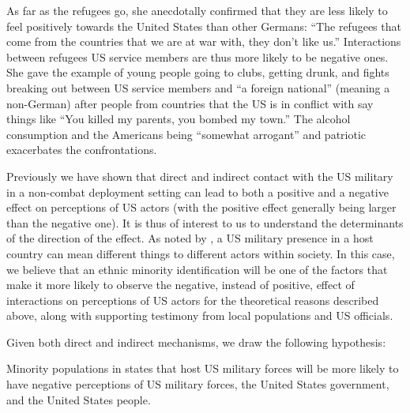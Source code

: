 As far as the refugees go, she anecdotally confirmed that they are less likely to feel positively towards the United States than other Germans: ``The refugees that come from the countries that we are at war with, they don't like us.'' Interactions between refugees US service members are thus more likely to be negative ones. She gave the example of young people going to clubs, getting drunk, and fights breaking out between US service members and ``a foreign national'' (meaning a non-German) after people from countries that the US is in conflict with say things like ``You killed my parents, you bombed my town.'' The alcohol consumption and the Americans being ``somewhat arrogant'' and patriotic exacerbates the confrontations. 

Previously we have shown that direct and indirect contact with the US military in a non-combat deployment setting can lead to both a positive and a negative effect on perceptions of US actors (with the positive effect generally being larger than the negative one).  It is thus of interest to us to understand the determinants of the direction of the effect. As noted by , a US military presence in a host country can mean different things to different actors within society. In this case, we believe that an ethnic minority identification will be one of the factors that make it more likely to observe the negative, instead of positive, effect of interactions on perceptions of US actors for the theoretical reasons described above, along with supporting testimony from local populations and US officials. 

Given both direct and indirect mechanisms, we draw the following hypothesis:

\begin{hyp}
Minority populations in states that host US military forces will be more likely to have negative perceptions of US military forces, the United States government, and the United States people. 
\end{hyp}


